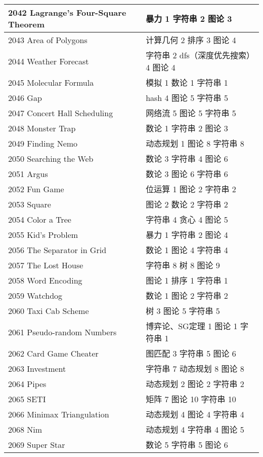 \begin{longtable}{| p{} | p{} |}
 2042 Lagrange's Four-Square Theorem  & 暴力 1 字符串 2 图论 3 \\ \hline
 2043 Area of Polygons  & 计算几何 2 排序 3 图论 4 \\ \hline
 2044 Weather Forecast  & 字符串 2 dfs（深度优先搜索） 4 图论 4 \\ \hline
 2045 Molecular Formula  & 模拟 1 数论 1 字符串 1 \\ \hline
 2046 Gap  & hash 4 图论 5 字符串 5 \\ \hline
 2047 Concert Hall Scheduling  & 网络流 5 图论 5 字符串 5 \\ \hline
 2048 Monster Trap  & 数论 1 字符串 2 图论 3 \\ \hline
 2049 Finding Nemo  & 动态规划 1 图论 8 字符串 8 \\ \hline
 2050 Searching the Web  & 数论 3 字符串 4 图论 6 \\ \hline
 2051 Argus  & 数论 3 图论 6 字符串 6 \\ \hline
 2052 Fun Game  & 位运算 1 图论 2 字符串 2 \\ \hline
 2053 Square  & 图论 2 数论 2 字符串 2 \\ \hline
 2054 Color a Tree  & 字符串 4 贪心 4 图论 5 \\ \hline
 2055 Kid's Problem  & 暴力 1 字符串 2 图论 4 \\ \hline
 2056 The Separator in Grid  & 数论 1 图论 4 字符串 4 \\ \hline
 2057 The Lost House  & 字符串 8 树 8 图论 9 \\ \hline
 2058 Word Encoding  & 图论 1 排序 1 字符串 1 \\ \hline
 2059 Watchdog  & 数论 1 图论 2 字符串 2 \\ \hline
 2060 Taxi Cab Scheme  & 树 3 图论 5 字符串 5 \\ \hline
 2061 Pseudo-random Numbers  & 博弈论、SG定理 1 图论 1 字符串 1 \\ \hline
 2062 Card Game Cheater  & 图匹配 3 字符串 5 图论 6 \\ \hline
 2063 Investment  & 字符串 7 动态规划 8 图论 8 \\ \hline
 2064 Pipes  & 动态规划 2 图论 2 字符串 2 \\ \hline
 2065 SETI  & 矩阵 7 图论 10 字符串 10 \\ \hline
 2066 Minimax Triangulation  & 动态规划 4 图论 4 字符串 4 \\ \hline
 2068 Nim  & 动态规划 4 字符串 4 图论 5 \\ \hline
 2069 Super Star  & 数论 5 字符串 5 图论 6 \\ \hline

\end{longtable}
